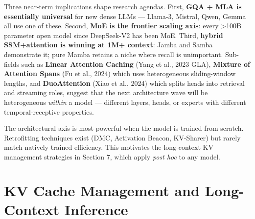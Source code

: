 Three near-term implications shape research agendas. First, \textbf{GQA + MLA is essentially universal} for new dense LLMs --- Llama-3, Mistral, Qwen, Gemma all use one of these. Second, \textbf{MoE is the frontier scaling axis}: every \textgreater100B parameter open model since DeepSeek-V2 has been MoE. Third, \textbf{hybrid SSM+attention is winning at 1M+ context}: Jamba and Samba demonstrate it; pure Mamba retains a niche where recall is unimportant. Sub-fields such as \textbf{Linear Attention Caching} (Yang et al., 2023 GLA), \textbf{Mixture of Attention Spans} (Fu et al., 2024) which uses heterogeneous sliding-window lengths, and \textbf{DuoAttention} (Xiao et al., 2024) which splits heads into retrieval and streaming roles, suggest that the next architecture wave will be heterogeneous \emph{within} a model --- different layers, heads, or experts with different temporal-receptive properties.

The architectural axis is most powerful when the model is trained from scratch. Retrofitting techniques exist (DMC, Activation Beacon, KV-Sharer) but rarely match natively trained efficiency. This motivates the long-context KV management strategies in Section 7, which apply \emph{post hoc} to any model.

\section{KV Cache Management and Long-Context Inference}\label{kv-cache-management-and-long-context-inference}

